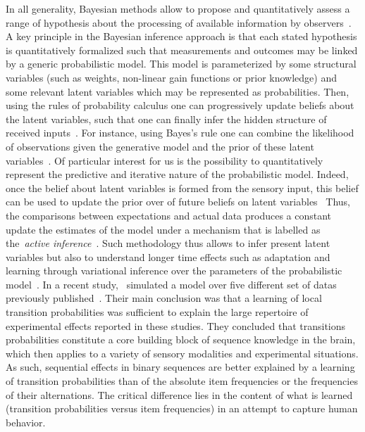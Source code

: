 \documentclass[profile,final,english,draft]{article}%
\newcommand{\citep}[1]{\parencite{#1}}
\newcommand{\citet}[1]{\textcite{#1}}
\begin{document}
In all generality, Bayesian methods allow to propose and quantitatively assess
a range of hypothesis about the processing
of available information by observers~\citep{Deneve1999, Diaconescu2014, Deaunizau}.
A key principle in the Bayesian inference approach is
that each stated hypothesis is quantitatively formalized
such that measurements and outcomes may be linked by
a generic probabilistic model. %
This model is parameterized by some structural variables
(such as weights, non-linear gain functions or prior knowledge)
and some relevant latent variables
which may be represented as probabilities.
Then, using the rules of probability calculus
one can progressively update beliefs about the latent variables,
such that one can finally infer the hidden structure of received inputs~\citep{Hoyer2003, Ma2014}.
For instance, using Bayes's rule one can combine
the likelihood of observations given the generative model and
the prior of these latent variables~\citep{Janes2014}.
Of particular interest for us is the possibility to
quantitatively represent
the predictive and iterative nature of the probabilistic model.
Indeed, once the belief about latent variables
is formed from the sensory input,
this belief can be used to update
the prior over of future beliefs on latent variables~\citep{Montagnini2007}
Thus, the comparisons between expectations and actual data produces
a constant update the estimates of the model under a mechanism
that is labelled as the~\textit{active inference}~\citep{Friston2003, Friston2010}.
Such methodology thus allows to infer present latent variables
but also to understand longer time effects such as adaptation and learning
through variational inference over
the parameters of the probabilistic model~\citep{ref}.
In a recent study,~\citet{Meyniel2016} simulated
a model over five different set of datas
previously published~\citep{Squires1976, Huettel2002, Kolossa2013, Cho2002, Falk1997}.
Their main conclusion was that
a learning of local transition probabilities
was sufficient to explain the large repertoire
of experimental effects reported in these studies.
They concluded that transitions probabilities constitute
a core building block of sequence knowledge in the brain,
which then applies to a variety of sensory modalities and
experimental situations.
As such, sequential effects in binary sequences are better explained
by a learning of transition probabilities
than of the absolute item frequencies or the frequencies of their alternations.
The critical difference lies in the content
of what is learned (transition probabilities versus item frequencies)
in an attempt to capture human behavior.
\end{document}
